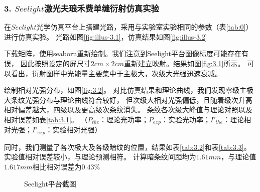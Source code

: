 \documentclass[12pt,a4paper,UTF8]{ctexart}
\begin{document}
\subsubsection*{3. $Seelight$激光夫琅禾费单缝衍射仿真实验}

在$Seelight$光学仿真平台上搭建光路，采用与实验室实验相同的参数（表\ref{tab:0}）进行仿真实验。
光路如图\ref{fig:illus-3.1}，仿真结果如图\ref{fig:illus-3.2}

下载矩阵，使用seaborn重新绘制。我们注意到Seelight平台图像标度可能存在有误，
因此按照设定的屏尺寸$2cm \times 2cm$重新建立映射。结果如图\ref{fig:3.1}所示。
可以看出，衍射图样中光能量主要集中于主极大，次级大光强迅速衰减。

绘制相对光强分布，如图\ref{fig:3.2}。
对比仿真结果和理论曲线，我们发现零级主极大条纹光强分布与理论曲线符合较好，
但次级大相对光强偏低，且随着级次升高相对偏差越大，四级以及更高级次条纹消失。
条纹各次级大峰值与理论对照以及相对误差如表\ref{tab:3.1}。
（$P_{the}$：理论光功率；$P_{exp}$：实验光功率；$I'_{the}$：理论相对光强；$I'_{exp}$：实验相对光强）

同时，我们测量了各次极大及各级暗纹的位置，结果如表\ref{tab:3.2}和表\ref{tab:3.3}。
实验值相对误差较小，与理论预测相符。
计算暗条纹间距均为$1.61mm$，与理论值$1.617mm$相比相对误差为$0.43\%$

\begin{figure}[htbp]
	\centering
	\caption{Seelight平台截图}
\end{figure}
\end{document}
